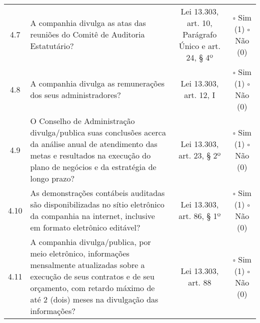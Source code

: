 \begin{center}
\begin{longtable}{c l c c}
4.7 &\parbox[t]{8cm}{A companhia divulga as atas das reuniões do Comitê de Auditoria Estatutário?} & \parbox[t]{2cm}{Lei 13.303, art. 10, Parágrafo Único e art. 24, § 4º } & \parbox[t]{2cm}{$\square$ Sim (1) \\ $\square$ Não (0)}\\

4.8 &\parbox[t]{8cm}{A companhia divulga as remunerações dos seus administradores?} & \parbox[t]{2cm}{Lei 13.303, art. 12, I} & \parbox[t]{2cm}{$\square$ Sim (1) \\ $\square$ Não (0)}\\

4.9 &\parbox[t]{8cm}{O Conselho de Administração divulga/publica suas conclusões acerca da análise anual de atendimento das metas e resultados na execução do plano de negócios e da estratégia de longo prazo?} & \parbox[t]{2cm}{Lei 13.303, art. 23, § 2º} & \parbox[t]{2cm}{$\square$ Sim (1) \\ $\square$ Não (0)}\\

4.10 &\parbox[t]{8cm}{As demonstrações contábeis auditadas  são disponibilizadas no sítio eletrônico da companhia na internet, inclusive em formato eletrônico editável?} & \parbox[t]{2cm}{Lei 13.303, art. 86, § 1º} & \parbox[t]{2cm}{$\square$ Sim (1) \\ $\square$ Não (0)}\\

4.11 &\parbox[t]{8cm}{A companhia divulga/publica, por meio eletrônico, informações mensalmente atualizadas sobre a execução de seus contratos e de seu orçamento, com retardo máximo de até 2 (dois) meses na divulgação das informações?} & \parbox[t]{2cm}{Lei 13.303, art. 88} & \parbox[t]{2cm}{$\square$ Sim (1) \\ $\square$ Não (0)}\\

\end{longtable}
\end{center}
\pagebreak

